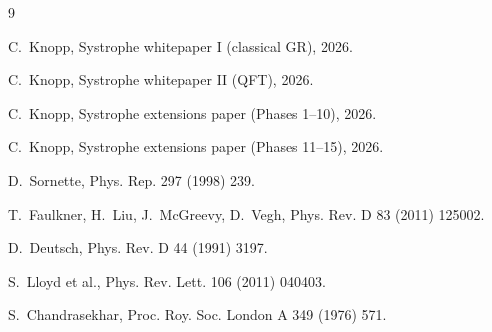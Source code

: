 \documentclass[11pt,a4paper]{article}
\begin{document}

\begin{thebibliography}{9}

C.~Knopp, Systrophe whitepaper I (classical GR), 2026.

C.~Knopp, Systrophe whitepaper II (QFT), 2026.

C.~Knopp, Systrophe extensions paper (Phases 1--10), 2026.

C.~Knopp, Systrophe extensions paper (Phases 11--15), 2026.

D.~Sornette, Phys. Rep. 297 (1998) 239.

T.~Faulkner, H.~Liu, J.~McGreevy, D.~Vegh, Phys. Rev. D 83 (2011) 125002.

D.~Deutsch, Phys. Rev. D 44 (1991) 3197.

S.~Lloyd et al., Phys. Rev. Lett. 106 (2011) 040403.

S.~Chandrasekhar, Proc. Roy. Soc. London A 349 (1976) 571.

\end{thebibliography}
\end{document}
